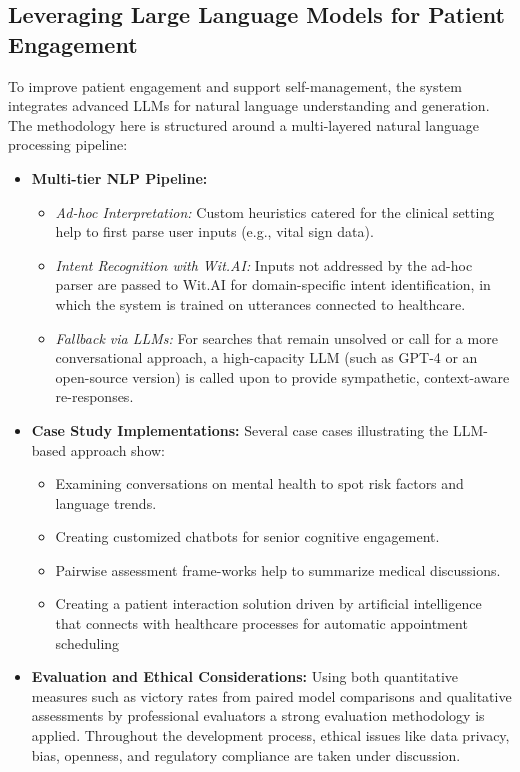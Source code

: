 \subsection{Leveraging Large Language Models for Patient Engagement}
To improve patient engagement and support self-management, the system integrates advanced LLMs for natural language understanding and generation. The methodology here is structured around a multi-layered natural language processing pipeline:
\begin{itemize}[itemsep=2em]
    \item \textbf{Multi-tier NLP Pipeline:} 
          \begin{itemize}[itemsep=2em]
              \item \emph{Ad-hoc Interpretation:} Custom heuristics catered for the clinical setting help to first parse user inputs (e.g., vital sign data).
              \item \emph{Intent Recognition with Wit.AI:} Inputs not addressed by the ad-hoc parser are passed to Wit.AI for domain-specific intent identification, in which the system is trained on utterances connected to healthcare.
              \item \emph{Fallback via LLMs:} For searches that remain unsolved or call for a more conversational approach, a high-capacity LLM (such as GPT-4 or an open-source version) is called upon to provide sympathetic, context-aware re-responses.
          \end{itemize}
    \item \textbf{Case Study Implementations:} Several case cases illustrating the LLM-based approach show:
          \begin{itemize}[itemsep=2em]
              \item Examining conversations on mental health to spot risk factors and language trends.
              \item Creating customized chatbots for senior cognitive engagement.
              \item Pairwise assessment frame-works help to summarize medical discussions.
              \item Creating a patient interaction solution driven by artificial intelligence that connects with healthcare processes for automatic appointment scheduling
          \end{itemize}
    \item \textbf{Evaluation and Ethical Considerations:} Using both quantitative measures such as victory rates from paired model comparisons and qualitative assessments by professional evaluators a strong evaluation methodology is applied.  Throughout the development process, ethical issues like data privacy, bias, openness, and regulatory compliance are taken under discussion.

\end{itemize}

